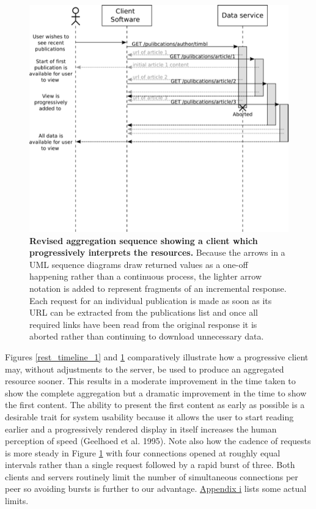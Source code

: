 \documentclass[12pt, ]{article}
\makeatletter
\def\maxwidth{\ifdim\Gin@nat@width>\linewidth\linewidth
\else\Gin@nat@width\fi}
\let\Oldincludegraphics\includegraphics
\renewcommand{\includegraphics}[1]{\Oldincludegraphics[width=\maxwidth]{#1}}
\makeatother
\begin{document}
\begin{figure}[htbp]
\centering
\includegraphics{images/rest_timeline_2.png}
\caption{\textbf{Revised aggregation sequence showing a client which
progressively interprets the resources.} Because the arrows in a UML
sequence diagrams draw returned values as a one-off happening rather
than a continuous process, the lighter arrow notation is added to
represent fragments of an incremental response. Each request for an
individual publication is made as soon as its URL can be extracted from
the publications list and once all required links have been read from
the original response it is aborted rather than continuing to download
unnecessary data. \label{rest_timeline_2}}
\end{figure}

Figures \ref{rest_timeline_1} and \ref{rest_timeline_2} comparatively
illustrate how a progressive client may, without adjustments to the
server, be used to produce an aggregated resource sooner. This results
in a moderate improvement in the time taken to show the complete
aggregation but a dramatic improvement in the time to show the first
content. The ability to present the first content as early as possible
is a desirable trait for system usability because it allows the user to
start reading earlier and a progressively rendered display in itself
increases the human perception of speed (Geelhoed et al. 1995). Note
also how the cadence of requests is more steady in Figure
\ref{rest_timeline_2} with four connections opened at roughly equal
intervals rather than a single request followed by a rapid burst of
three. Both clients and servers routinely limit the number of
simultaneous connections per peer so avoiding bursts is further to our
advantage. \hyperref[appendixux5fhttpux5flimits]{Appendix i} lists some
actual limits.
\end{document}
